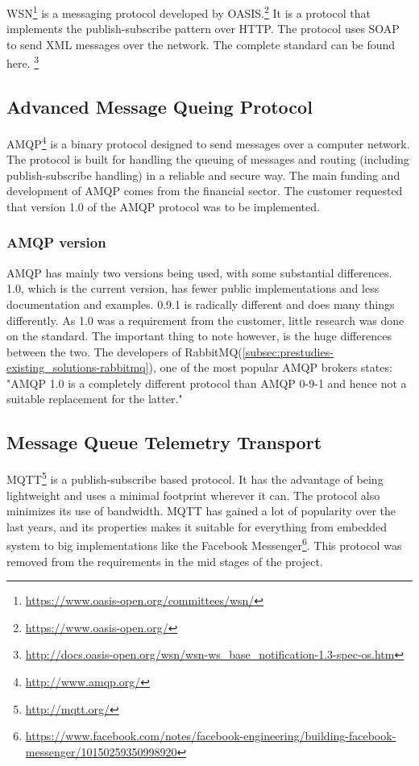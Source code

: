 WSN\footnote{\url{https://www.oasis-open.org/committees/wsn/}} is a messaging protocol developed by OASIS.\footnote{\url{https://www.oasis-open.org/}} It is a protocol that implements the publish-subscribe pattern over HTTP. The protocol uses SOAP to send XML messages over the network. The complete standard can be found here. \footnote{\url{http://docs.oasis-open.org/wsn/wsn-ws_base_notification-1.3-spec-os.htm}}

\subsection{Advanced Message Queing Protocol}
\label{subsec:prestudies-amqp}
AMQP\footnote{\url{http://www.amqp.org/}} is a binary protocol designed to send messages over a computer network. The protocol is built for handling the queuing of messages and routing (including publish-subscribe handling) in a reliable and secure way. The main funding and development of AMQP comes from the financial sector. The customer requested that version 1.0 of the AMQP protocol was to be implemented.

\subsubsection{AMQP version}
\label{subsec:prestudies-amqp-amqp_version}
AMQP has mainly two versions being used, with some substantial differences. 1.0, which is the current version, has fewer public implementations and less documentation and examples. 0.9.1 is radically different and does many things differently. As 1.0 was a requirement from the customer, little research was done on the standard. The important thing to note however, is the huge differences between the two. The developers of RabbitMQ(\ref{subsec:prestudies-existing_solutions-rabbitmq}), one of the most popular AMQP brokers states: "AMQP 1.0 is a completely different protocol than AMQP 0-9-1 and hence not a suitable replacement for the latter."

\subsection{Message Queue Telemetry Transport}
\label{subsec:prestudies-mqtt}
MQTT\footnote{\url{http://mqtt.org/}} is a publish-subscribe based protocol. It has the advantage of being lightweight and uses a minimal footprint wherever it can. The protocol also minimizes its use of bandwidth. MQTT has gained a lot of popularity over the last years, and its properties makes it suitable for everything from embedded system to big implementations like the Facebook Messenger\footnote{\url{https://www.facebook.com/notes/facebook-engineering/building-facebook-messenger/10150259350998920}}. This protocol was removed from the requirements in the mid stages of the project.

